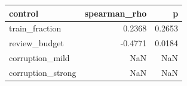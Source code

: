 \begin{tabular}{lrr}
\toprule
          control &  spearman\_rho &      p \\
\midrule
   train\_fraction &        0.2368 & 0.2653 \\
    review\_budget &       -0.4771 & 0.0184 \\
  corruption\_mild &           NaN &    NaN \\
corruption\_strong &           NaN &    NaN \\
\bottomrule
\end{tabular}
